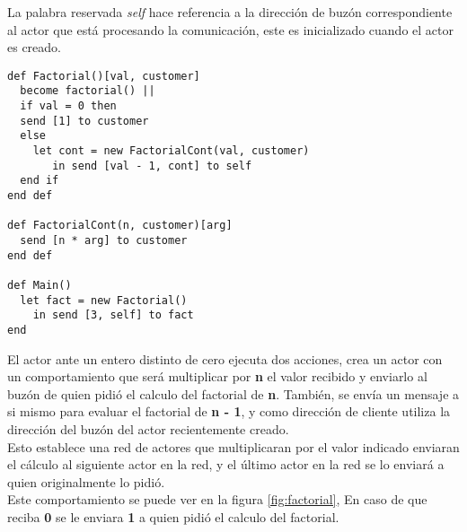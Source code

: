 \documentclass[fleqn]{article}
\begin{document}
La palabra reservada \textit{self} hace referencia a la dirección de buzón
correspondiente al actor que está procesando la comunicación, este es inicializado
cuando el actor es creado.

\begin{lstlisting}[language=sal, style=simple]
def Factorial()[val, customer]
  become factorial() ||
  if val = 0 then
  send [1] to customer
  else
    let cont = new FactorialCont(val, customer)
       in send [val - 1, cont] to self
  end if 
end def

def FactorialCont(n, customer)[arg] 
  send [n * arg] to customer
end def

def Main() 
  let fact = new Factorial() 
    in send [3, self] to fact
end
\end{lstlisting}

El actor ante un entero distinto de cero ejecuta dos acciones, crea un actor con
un comportamiento que será multiplicar por \textbf{n} el valor recibido y
enviarlo al buzón de quien pidió el calculo del factorial de \textbf{n}.
También, se envía un mensaje a si mismo para evaluar el factorial de \textbf{n -
  1}, y como dirección de cliente utiliza la dirección del buzón del actor
recientemente creado. \\
Esto establece una red de actores que multiplicaran por 
el valor indicado enviaran el cálculo al siguiente actor en la red, y el último actor 
en la red se lo enviará a quien originalmente lo pidió. \\
Este comportamiento se puede ver en la figura \ref{fig:factorial}, 
En caso de que reciba \textbf{0} se le enviara \textbf{1} a quien pidió el
calculo del factorial. 
\end{document}
